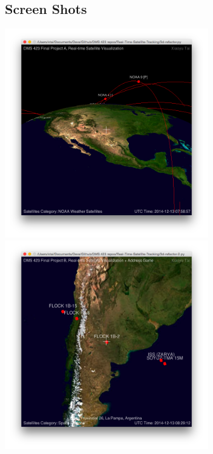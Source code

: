 \documentclass[letter]{article}
\begin{document}
\begin{flushleft}
\section{Screen Shots}
\begin{center}
    \includegraphics[width=3.5in]{1.png}\includegraphics[width=3.5in]{2.png}
    
\end{center}
\end{flushleft}
\end{document}
